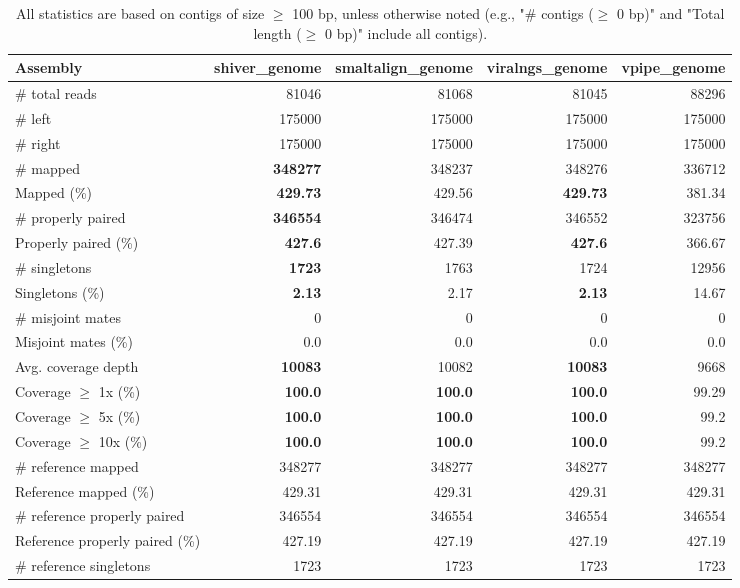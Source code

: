 \documentclass[12pt,a4paper]{article}
\begin{document}
\begin{table}[ht]
\begin{center}
\caption{All statistics are based on contigs of size $\geq$ 100 bp, unless otherwise noted (e.g., "\# contigs ($\geq$ 0 bp)" and "Total length ($\geq$ 0 bp)" include all contigs).}
\begin{tabular}{|l*{4}{|r}|}
\hline
Assembly & shiver\_genome & smaltalign\_genome & viralngs\_genome & vpipe\_genome \\ \hline
\# total reads & 81046 & 81068 & 81045 & 88296 \\ \hline
\# left & 175000 & 175000 & 175000 & 175000 \\ \hline
\# right & 175000 & 175000 & 175000 & 175000 \\ \hline
\# mapped & {\bf 348277} & 348237 & 348276 & 336712 \\ \hline
Mapped (\%) & {\bf 429.73} & 429.56 & {\bf 429.73} & 381.34 \\ \hline
\# properly paired & {\bf 346554} & 346474 & 346552 & 323756 \\ \hline
Properly paired (\%) & {\bf 427.6} & 427.39 & {\bf 427.6} & 366.67 \\ \hline
\# singletons & {\bf 1723} & 1763 & 1724 & 12956 \\ \hline
Singletons (\%) & {\bf 2.13} & 2.17 & {\bf 2.13} & 14.67 \\ \hline
\# misjoint mates & 0 & 0 & 0 & 0 \\ \hline
Misjoint mates (\%) & 0.0 & 0.0 & 0.0 & 0.0 \\ \hline
Avg. coverage depth & {\bf 10083} & 10082 & {\bf 10083} & 9668 \\ \hline
Coverage $\geq$ 1x (\%) & {\bf 100.0} & {\bf 100.0} & {\bf 100.0} & 99.29 \\ \hline
Coverage $\geq$ 5x (\%) & {\bf 100.0} & {\bf 100.0} & {\bf 100.0} & 99.2 \\ \hline
Coverage $\geq$ 10x (\%) & {\bf 100.0} & {\bf 100.0} & {\bf 100.0} & 99.2 \\ \hline
\# reference mapped & 348277 & 348277 & 348277 & 348277 \\ \hline
Reference mapped (\%) & 429.31 & 429.31 & 429.31 & 429.31 \\ \hline
\# reference properly paired & 346554 & 346554 & 346554 & 346554 \\ \hline
Reference properly paired (\%) & 427.19 & 427.19 & 427.19 & 427.19 \\ \hline
\# reference singletons & 1723 & 1723 & 1723 & 1723 \\ \hline

\end{tabular}
\end{center}
\end{table}
\end{document}
